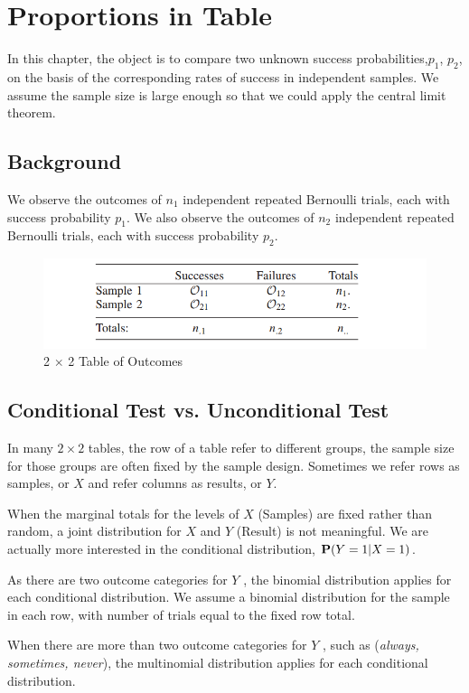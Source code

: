 \section{Proportions in Table}
In this chapter, the object is to compare two unknown success probabilities,$p_1$, $p_2$, on the basis of the corresponding rates of success in independent samples. We assume the sample size is large enough so that we could apply the central limit theorem.

\subsection{Background}
We observe the outcomes of $n_1$ independent repeated Bernoulli trials, each with success probability $p_1$. We also observe the outcomes of $n_2$ independent repeated Bernoulli trials, each with success probability $p_2$.

\begin{figure}[H]
	\centering
	\includegraphics[width=0.7\linewidth]{fig/2x2-table}
	\caption{2 $\times$ 2 Table of Outcomes}
	\label{fig:2x2-table}
\end{figure}

\subsection{Conditional Test vs. Unconditional Test}

In many $2 \times 2$ tables, the row of a table refer to different groups, the sample size for those groups are often fixed by the sample design. Sometimes we refer rows as samples, or $X$ and refer columns as results, or $Y$.

When the marginal totals for the levels of $X$ (Samples) are fixed rather than random, a joint distribution for $X$ and $Y$ (Result) is not meaningful. We are actually more interested in the conditional distribution, $\P(Y=1|X=1)$.

As there are two outcome categories for $Y$ , the binomial
distribution applies for each conditional distribution. We assume
a binomial distribution for the sample in each row, with number
of trials equal to the fixed row total.

When there are more than two outcome categories for $Y$ , such
as (\textit{always, sometimes, never}), the multinomial distribution
applies for each conditional distribution.

